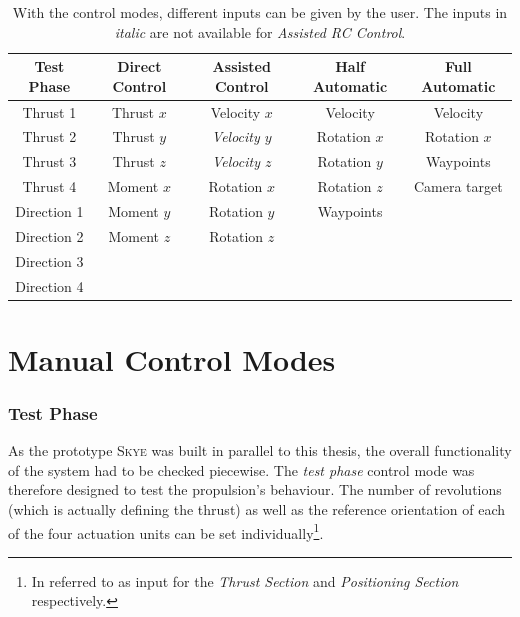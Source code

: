 \begin{table}[h]		%
	\begin{tabular}{c c c c c} %
	Test Phase 		& Direct Control 	& Assisted Control 	& Half Automatic	& Full Automatic  \\
	\toprule[1.25pt]				%
	Thrust 1		& Thrust $x$	& Velocity $x$	& Velocity	& Velocity	\\
	Thrust 2		& Thrust $y$	& \textit{Velocity $y$}	& Rotation $x$	& Rotation $x$\\
	Thrust 3		& Thrust $z$	& \textit{Velocity $z$}	& Rotation $y$	& Waypoints	\\
	Thrust 4		& Moment $x$	& Rotation $x$	& Rotation $z$	&	Camera target\\
	Direction 1		& Moment $y$	& Rotation $y$	& Waypoints	&	\\
	Direction 2		& Moment $z$	& Rotation $z$	&		&	\\
	Direction 3		& 		& 		&		&	\\
	Direction 4		& 		& 		&		&	\\

	\bottomrule[1.25pt]
	\end{tabular} 
	\caption[The different control modes]{With the control modes, different inputs can be given by the user. The inputs in \textit{italic} are not available for \textit{Assisted RC  Control}.}
	\label{tab:control_modes}
\end{table}

\section{Manual Control Modes}
\label{sec:manualControlModes}
\subsubsection{Test Phase} 
As the prototype \textsc{Skye} was built in parallel to this thesis, the overall functionality of the system had to be checked piecewise. The \textit{test phase} control mode was therefore designed to test the propulsion's behaviour. The number of revolutions (which is actually defining the thrust) as well as the reference orientation of each of the four actuation units can be set individually\footnote{In \cite{schaffnervu} referred to as input for the \textit{Thrust Section} and \textit{Positioning Section} respectively.}.


